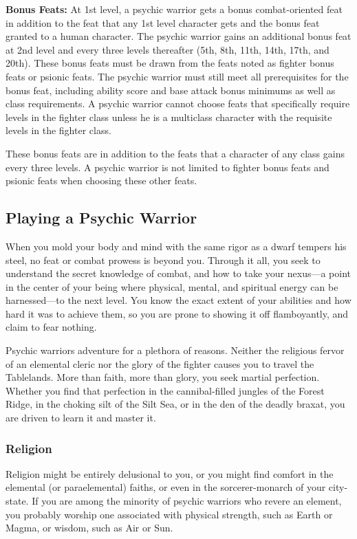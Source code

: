 \textbf{Bonus Feats:} At 1st level, a psychic warrior gets a bonus combat-oriented feat in addition to the feat that any 1st level character gets and the bonus feat granted to a human character. The psychic warrior gains an additional bonus feat at 2nd level and every three levels thereafter (5th, 8th, 11th, 14th, 17th, and 20th). These bonus feats must be drawn from the feats noted as fighter bonus feats or psionic feats. The psychic warrior must still meet all prerequisites for the bonus feat, including ability score and base attack bonus minimums as well as class requirements. A psychic warrior cannot choose feats that specifically require levels in the fighter class unless he is a multiclass character with the requisite levels in the fighter class.

These bonus feats are in addition to the feats that a character of any class gains every three levels. A psychic warrior is not limited to fighter bonus feats and psionic feats when choosing these other feats.

\subsection{Playing a Psychic Warrior}

When you mold your body and mind with the same rigor as a dwarf tempers his steel, no feat or combat prowess is beyond you. Through it all, you seek to understand the secret knowledge of combat, and how to take your nexus---a point in the center of your being where physical, mental, and spiritual energy can be harnessed---to the next level. You know the exact extent of your abilities and how hard it was to achieve them, so you are prone to showing it off flamboyantly, and claim to fear nothing.

Psychic warriors adventure for a plethora of reasons. Neither the religious fervor of an elemental cleric nor the glory of the fighter causes you to travel the Tablelands. More than faith, more than glory, you seek martial perfection. Whether you find that perfection in the cannibal-filled jungles of the Forest Ridge, in the choking silt of the Silt Sea, or in the den of the deadly braxat, you are driven to learn it and master it.

\subsubsection{Religion}

Religion might be entirely delusional to you, or you might find comfort in the elemental (or paraelemental) faiths, or even in the sorcerer-monarch of your city-state. If you are among the minority of psychic warriors who revere an element, you probably worship one associated with physical strength, such as Earth or Magma, or wisdom, such as Air or Sun.

